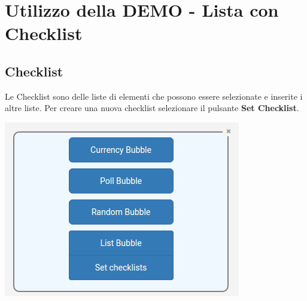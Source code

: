 \newpage

\section{Utilizzo della DEMO - Lista con Checklist}

\subsection{Checklist}

\begin{flushleft}
Le Checklist sono delle liste di elementi che possono essere selezionate e inserite i altre liste.
Per creare una nuova checklist selezionare il pulsante \textbf{Set Checklist}.\\
\begin{center}
\includegraphics[scale=0.75]{img/menu.png}
\end{center}


\end{flushleft}

